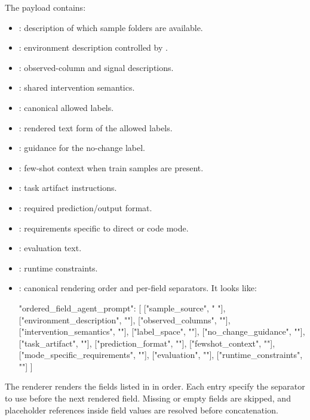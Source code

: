 \documentclass[11pt]{article}
\begin{document}
The payload contains:
\begin{itemize}
\item {}: description of which sample folders are available.
\item {}: environment description controlled by \termDescLevel.
\item {}: observed-column and signal descriptions.
\item {}: shared intervention semantics.
\item {}: canonical allowed labels.
\item {}: rendered text form of the allowed labels.
\item {}: guidance for the no-change label.
\item {}: few-shot context when train samples are present.
\item {}: task artifact instructions.
\item {}: required prediction/output format.
\item {}: requirements specific to direct or code mode.
\item {}: evaluation text.
\item {}: runtime constraints.
\item {}: canonical rendering order and per-field separators. It looks like: 
\begin{DocCode}
    "ordered_field_agent_prompt": [
    ["sample_source", " "],
    ["environment_description", "\n\n"],
    ["observed_columns", "\n\n"],
    ["intervention_semantics", "\n\n"],
    ["label_space", "\n\n"],
    ["no_change_guidance", "\n\n"],
    ["task_artifact", "\n"],
    ["prediction_format", "\n\n"],
    ["fewshot_context", "\n\n"],
    ["mode_specific_requirements", "\n\n"],
    ["evaluation", "\n\n"],
    ["runtime_constraints", ""]
  ]
\end{DocCode}
\end{itemize}

The renderer renders the fields listed in  in order.
Each entry specify the separator to use before the next rendered field.
Missing or empty fields are skipped, and placeholder references inside field values are resolved before concatenation.
\end{document}
